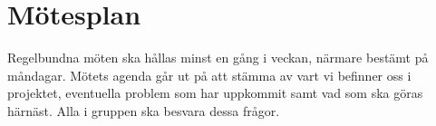 \section{Mötesplan}

Regelbundna möten ska hållas minst en gång i veckan, närmare bestämt på måndagar. Mötets agenda går ut på att stämma av vart vi befinner oss i projektet, eventuella problem som har uppkommit samt vad som ska göras härnäst. Alla i gruppen ska besvara dessa frågor. 
